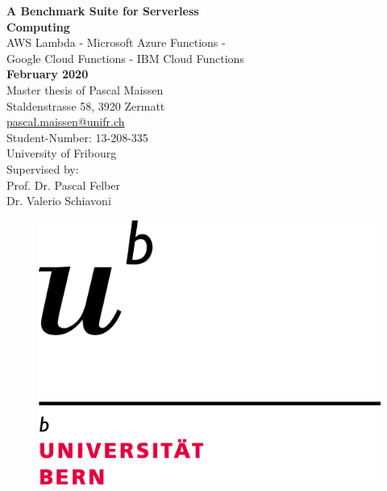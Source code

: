 \begin{center}
\vspace*{2cm}
\textrm{\Huge \textbf{A Benchmark Suite for Serverless}}\\
\vspace*{0.3cm}
\textrm{\Huge \textbf{Computing}}\\
\vspace*{0.3cm}
\textrm{\LARGE AWS Lambda - Microsoft Azure Functions - }\\
\vspace*{0.1cm}
\textrm{\LARGE Google Cloud Functions - IBM Cloud Functions}\\[0,6mm]
\vspace*{1.3cm}
\textrm{\normalsize \textbf{February 2020}}\\[0,6mm]
\vspace*{1.5cm}
\textrm{\large Master thesis of Pascal Maissen}\\[0,6mm]
\textrm{\large Staldenstrasse 58, 3920 Zermatt}\\[0,6mm]
\textrm{\large \href{mailto:pascal.maissen@unifr.ch}{pascal.maissen@unifr.ch}}\\[0,6mm]
\textrm{\large Student-Number: 13-208-335}\\[0,6mm]
\textrm{\large University of Fribourg}\\[0,6mm]
\vspace*{1.8cm}
\textrm{\large Supervised by:}\\[0,6mm]
\vspace*{0.1cm}
\textrm{\large Prof. Dr. Pascal Felber}\\
\textrm{\large Dr. Valerio Schiavoni}
\\
\vspace*{1.3cm}
\begin{figure}[htp]
    \centering
    \includegraphics[scale=0.30]{bilder/logos/UNI_Bern.png}\hfill

\end{figure}
\end{center}
